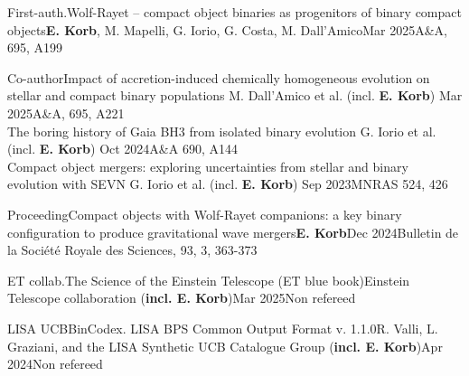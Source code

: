 %
%
%

\begin{experiences}
    \publicationtags
    {First-auth.}{Wolf-Rayet -- compact object binaries as progenitors of binary compact objects}{\textbf{E. Korb}, M. Mapelli, G. Iorio, G. Costa, M. Dall'Amico}{Mar 2025}{A\&A, 695, A199 }{}
    \emptySeparator

    \publicationtags
    {Co-author}{Impact of accretion-induced chemically homogeneous evolution on stellar and compact binary populations}
    {M. Dall'Amico et al. (incl. \textbf{E. Korb})}
    {Mar 2025}{A\&A, 695, A221}
    {} 
    \\
    \bigskip
    \publicationtags
    {}{The boring history of Gaia BH3 from isolated binary evolution}
    {G. Iorio et al. (incl. \textbf{E. Korb})}
    {Oct 2024}{A\&A 690, A144}
    {} 
    \\
    \bigskip
    \publicationtags
    {}{Compact object mergers: exploring uncertainties from stellar and binary evolution with SEVN}
    {G. Iorio et al. (incl. \textbf{E. Korb})}
    {Sep 2023}{MNRAS 524, 426}
    {}    
    \emptySeparator
    
    \publicationtags
    {Proceeding}{Compact objects with Wolf-Rayet companions: a key binary configuration to produce gravitational wave mergers}{\textbf{E. Korb}}{Dec 2024}{Bulletin de la Société Royale des Sciences, 93, 3, 363-373 %
    }{}
    \emptySeparator
    
    \publicationtags
    {ET collab.}{The Science of the Einstein Telescope (ET blue book)}{Einstein Telescope collaboration (\textbf{incl. E. Korb})}{Mar 2025}{Non refereed}{}
    \emptySeparator
    
    \publicationtags
    {LISA UCB}{BinCodex. LISA BPS Common Output Format v. 1.1.0}{R. Valli, L. Graziani, and the LISA Synthetic UCB Catalogue Group (\textbf{incl. E. Korb})}{Apr 2024}{Non refereed}{}
\end{experiences}